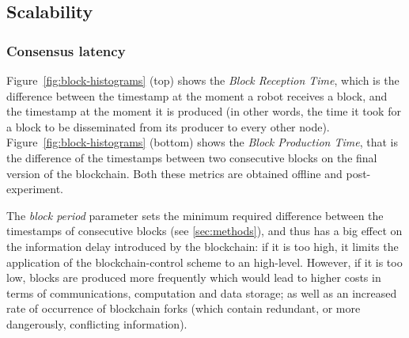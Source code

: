 \documentclass[runningheads]{llncs}
\begin{document}


\subsection{Scalability}
\label{subsec:scalability}

\subsubsection{Consensus latency}

 Figure~\ref{fig:block-histograms} (top) shows the \emph{Block Reception Time}, which is the difference between the timestamp at the moment a robot receives a block, and the timestamp at the moment it is produced (in other words, the time it took for a block to be disseminated from its producer to every other node). Figure~\ref{fig:block-histograms} (bottom) shows the \emph{Block Production Time}, that is the difference of the timestamps between two consecutive blocks on the final version of the blockchain. Both these metrics are obtained offline and post-experiment.
 
The \emph{block period} parameter sets the minimum required difference between the timestamps of consecutive blocks (see \ref{sec:methods}), and thus has a big effect on the information delay introduced by the blockchain: if it is too high, it limits the application of the blockchain-control scheme to an high-level. However, if it is too low, blocks are produced more frequently which would lead to higher costs in terms of communications, computation and data storage; as well as an increased rate of occurrence of blockchain forks (which contain redundant, or more dangerously, conflicting information).
 
\end{document}
